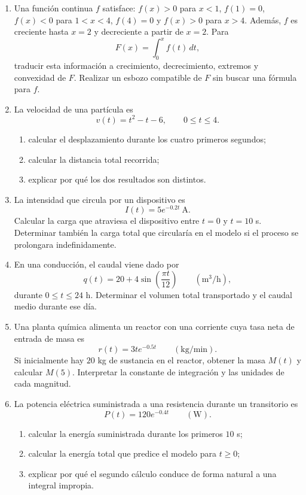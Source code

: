 \begin{enumerate}
\item Una función continua $f$ satisface: $f(x)>0$ para $x<1$, $f(1)=0$, $f(x)<0$ para $1<x<4$, $f(4)=0$ y $f(x)>0$ para $x>4$. Además, $f$ es creciente hasta $x=2$ y decreciente a partir de $x=2$. Para
\[
F(x)=\int_0^x f(t)\,dt,
\]
traducir esta información a crecimiento, decrecimiento, extremos y convexidad de $F$. Realizar un esbozo compatible de $F$ sin buscar una fórmula para $f$.

\item La velocidad de una partícula es
\[
v(t)=t^2-t-6,
\qquad 0\leq t\leq4.
\]
\begin{enumerate}[label=\alph*)]
\item calcular el desplazamiento durante los cuatro primeros segundos;
\item calcular la distancia total recorrida;
\item explicar por qué los dos resultados son distintos.
\end{enumerate}

\item La intensidad que circula por un dispositivo es
\[
I(t)=5e^{-0.2t}\ \mathrm{A}.
\]
Calcular la carga que atraviesa el dispositivo entre $t=0$ y $t=10$ s. Determinar también la carga total que circularía en el modelo si el proceso se prolongara indefinidamente.

\item En una conducción, el caudal viene dado por
\[
q(t)=20+4\sin\left(\frac{\pi t}{12}\right)
\qquad (\mathrm{m}^3/\mathrm{h}),
\]
durante $0\leq t\leq24$ h. Determinar el volumen total transportado y el caudal medio durante ese día.

\item Una planta química alimenta un reactor con una corriente cuya tasa neta de entrada de masa es
\[
r(t)=3te^{-0.5t}\qquad (\mathrm{kg/min}).
\]
Si inicialmente hay $20$ kg de sustancia en el reactor, obtener la masa $M(t)$ y calcular $M(5)$. Interpretar la constante de integración y las unidades de cada magnitud.

\item La potencia eléctrica suministrada a una resistencia durante un transitorio es
\[
P(t)=120e^{-0.4t}\qquad (\mathrm{W}).
\]
\begin{enumerate}[label=\alph*)]
\item calcular la energía suministrada durante los primeros $10$ s;
\item calcular la energía total que predice el modelo para $t\geq0$;
\item explicar por qué el segundo cálculo conduce de forma natural a una integral impropia.
\end{enumerate}


\end{enumerate}
